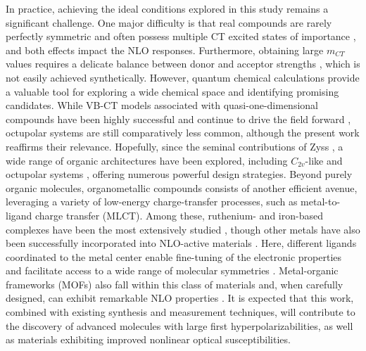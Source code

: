 \documentclass[USenglish]{article}
\begin{document}
In practice, achieving the ideal conditions explored in this study remains a significant challenge. One major difficulty is that real compounds are rarely perfectly symmetric and often possess multiple CT excited states of importance \cite{zhangTheoreticalInvestigationFirst2013}, and both effects impact the NLO responses. Furthermore, obtaining large $m_{CT}$ values requires a delicate balance between donor and acceptor strengths \cite{beaujeanUnravelingSymmetryEffects2022,postilsSecondorderNonlinearOptical2024}, which is not easily achieved synthetically.
However, quantum chemical calculations provide a valuable tool for exploring a wide chemical space and identifying promising candidates.
While VB-CT models associated with quasi-one-dimensional compounds have been highly successful \cite{bourhillExperimentalDemonstrationDependence1994,daltonOrganicElectroOpticsPhotonics2015,wuHighperformanceOrganicSecond2020} and continue to drive the field forward \cite{dalton25YearsOrganic2019,dubuisNonlinearOpticalResponses2023,dellaiDynamicEffectsNonlinear2024}, octupolar systems are still comparatively less common, although the present work reaffirms their relevance. Hopefully, since the seminal contributions of Zyss \cite{zyssMolecularEngineeringImplications1993}, a wide range of organic architectures have been explored, including $C_{2v}$-like \cite{yangLargeOffDiagonalContribution2003,castetSecondorderNonlinearOptical2021,postilsSecondorderNonlinearOptical2024} and octupolar systems \cite{choElementaryDescriptionNonlinear1998,panjaSumoverstateSchemeAnalysis2010,beaujeanMultiStateSecondOrderNonlinear2022}, offering numerous powerful design strategies.
Beyond purely organic molecules, organometallic compounds consists of another efficient avenue, leveraging a variety of low-energy charge-transfer processes, such as metal-to-ligand charge transfer (MLCT). Among these, ruthenium- and iron-based complexes have been the most extensively studied \cite{coeDevelopingIronRuthenium2013,ashcroftMolecularEngineeringOrganic2019}, though other metals have also been successfully incorporated into NLO-active materials \cite{costesSynthesisCrystalStructures2005,lamereSynthesisCharacterizationNonlinear2006,lacroixSecondorderNonlinearOptics2016}. Here, different ligands coordinated to the metal center enable fine-tuning of the electronic properties and facilitate access to a wide range of molecular symmetries \cite{ashcroftMolecularEngineeringOrganic2019,beaujeanUnravelingSymmetryEffects2022,hoodSynthesisOpticalNonlinear2024}. Metal-organic frameworks (MOFs) also fall within this class of materials and, when carefully designed, can exhibit remarkable NLO properties \cite{medishettyNonlinearOpticalProperties2017,chengNonlinearOpticalProperties2021}. It is expected that this work, combined with existing synthesis and measurement techniques, will contribute to the discovery of advanced molecules with large first hyperpolarizabilities, as well as materials exhibiting improved nonlinear optical susceptibilities.
\end{document}
